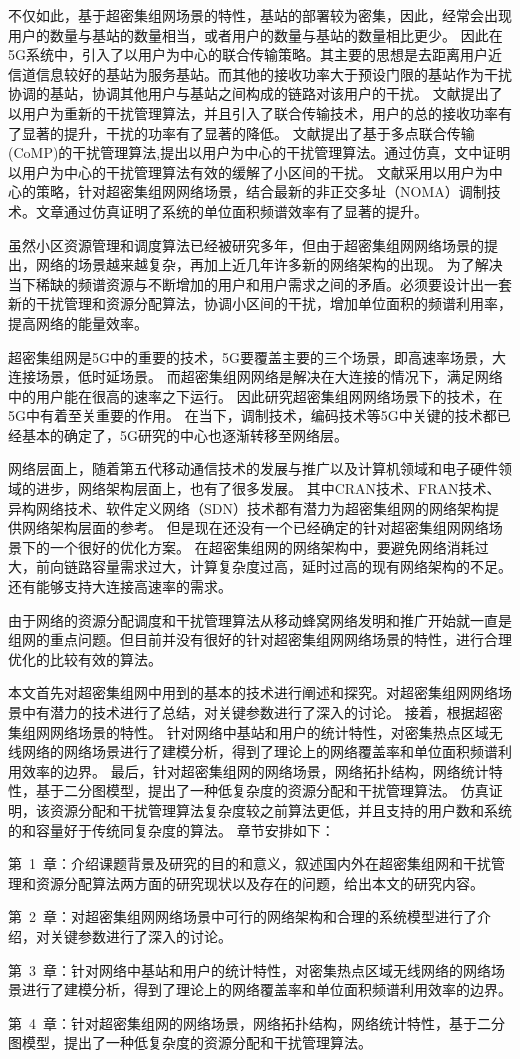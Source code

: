不仅如此，基于超密集组网场景的特性，基站的部署较为密集，因此，经常会出现用户的数量与基站的数量相当，或者用户的数量与基站的数量相比更少。
因此在5G系统中，引入了以用户为中心的联合传输策略。其主要的思想是去距离用户近信道信息较好的基站为服务基站。而其他的接收功率大于预设门限的基站作为干扰协调的基站，协调其他用户与基站之间构成的链路对该用户的干扰。
文献\cite{Ucent}提出了以用户为重新的干扰管理算法，并且引入了联合传输技术，用户的总的接收功率有了显著的提升，干扰的功率有了显著的降低。
文献\cite{CoMPUDN}提出了基于多点联合传输(CoMP)的干扰管理算法,提出以用户为中心的干扰管理算法。通过仿真，文中证明以用户为中心的干扰管理算法有效的缓解了小区间的干扰。
文献\cite{UNOMAcent}采用以用户为中心的策略，针对超密集组网网络场景，结合最新的非正交多址（NOMA）调制技术。文章通过仿真证明了系统的单位面积频谱效率有了显著的提升。

虽然小区资源管理和调度算法已经被研究多年，但由于超密集组网网络场景的提出，网络的场景越来越复杂，再加上近几年许多新的网络架构的出现。
为了解决当下稀缺的频谱资源与不断增加的用户和用户需求之间的矛盾。必须要设计出一套新的干扰管理和资源分配算法，协调小区间的干扰，增加单位面积的频谱利用率，提高网络的能量效率。


超密集组网是5G中的重要的技术，5G要覆盖主要的三个场景，即高速率场景，大连接场景，低时延场景。
而超密集组网网络是解决在大连接的情况下，满足网络中的用户能在很高的速率之下运行。
因此研究超密集组网网络场景下的技术，在5G中有着至关重要的作用。
在当下，调制技术，编码技术等5G中关键的技术都已经基本的确定了，5G研究的中心也逐渐转移至网络层。

网络层面上，随着第五代移动通信技术的发展与推广以及计算机领域和电子硬件领域的进步，网络架构层面上，也有了很多发展。
其中CRAN技术、FRAN技术、异构网络技术、软件定义网络（SDN）技术都有潜力为超密集组网的网络架构提供网络架构层面的参考。
但是现在还没有一个已经确定的针对超密集组网网络场景下的一个很好的优化方案。
在超密集组网的网络架构中，要避免网络消耗过大，前向链路容量需求过大，计算复杂度过高，延时过高的现有网络架构的不足。
还有能够支持大连接高速率的需求。

由于网络的资源分配调度和干扰管理算法从移动蜂窝网络发明和推广开始就一直是组网的重点问题。但目前并没有很好的针对超密集组网网络场景的特性，进行合理优化的比较有效的算法。



本文首先对超密集组网中用到的基本的技术进行阐述和探究。对超密集组网网络场景中有潜力的技术进行了总结，对关键参数进行了深入的讨论。
接着，根据超密集组网网络场景的特性。
针对网络中基站和用户的统计特性，对密集热点区域无线网络的网络场景进行了建模分析，得到了理论上的网络覆盖率和单位面积频谱利用效率的边界。
最后，针对超密集组网的网络场景，网络拓扑结构，网络统计特性，基于二分图模型，提出了一种低复杂度的资源分配和干扰管理算法。
仿真证明，该资源分配和干扰管理算法复杂度较之前算法更低，并且支持的用户数和系统的和容量好于传统同复杂度的算法。
章节安排如下：

第~1~章：介绍课题背景及研究的目的和意义，叙述国内外在超密集组网和干扰管理和资源分配算法两方面的研究现状以及存在的问题，给出本文的研究内容。

第~2~章：对超密集组网网络场景中可行的网络架构和合理的系统模型进行了介绍，对关键参数进行了深入的讨论。

第~3~章：针对网络中基站和用户的统计特性，对密集热点区域无线网络的网络场景进行了建模分析，得到了理论上的网络覆盖率和单位面积频谱利用效率的边界。

第~4~章：针对超密集组网的网络场景，网络拓扑结构，网络统计特性，基于二分图模型，提出了一种低复杂度的资源分配和干扰管理算法。
